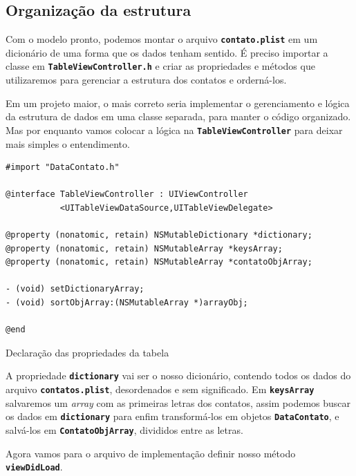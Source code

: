 \documentclass[a4paper,12pt,brazil,oneside]{book}
\begin{document}
\subsection{Organização da estrutura}


Com o modelo pronto, podemos montar o arquivo \texttt{\textbf{contato.plist}} em um dicionário de uma forma que os dados tenham sentido. É preciso importar a classe em \texttt{\textbf{TableViewController.h}} e criar as propriedades e métodos que utilizaremos para gerenciar a estrutura dos contatos e orderná-los.

Em um projeto maior, o mais correto seria implementar o gerenciamento e lógica da estrutura de dados em uma classe separada, para manter o código organizado. Mas por enquanto vamos colocar a lógica na \texttt{\textbf{TableViewController}} para deixar mais simples o entendimento.

\begin{listing}[H]
\begin{verbatim}
#import "DataContato.h"

@interface TableViewController : UIViewController 
           <UITableViewDataSource,UITableViewDelegate>

@property (nonatomic, retain) NSMutableDictionary *dictionary;
@property (nonatomic, retain) NSMutableArray *keysArray;
@property (nonatomic, retain) NSMutableArray *contatoObjArray;

- (void) setDictionaryArray;
- (void) sortObjArray:(NSMutableArray *)arrayObj;

@end
\end{verbatim}
\caption{Declaração das propriedades da tabela}
\end{listing}


A propriedade \texttt{\textbf{dictionary}} vai ser o nosso dicionário, contendo todos os dados do arquivo \texttt{\textbf{contatos.plist}}, desordenados e sem significado. Em \texttt{\textbf{keysArray}} salvaremos um \emph{array} com as primeiras letras dos contatos, assim podemos buscar os dados em \texttt{\textbf{dictionary}} para enfim transformá-los em objetos \texttt{\textbf{DataContato}}, e salvá-los em \texttt{\textbf{ContatoObjArray}}, divididos entre as letras.

Agora vamos para o arquivo de implementação definir nosso método \texttt{\textbf{viewDidLoad}}.
\end{document}
